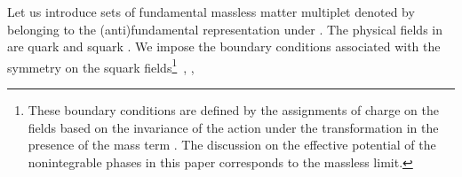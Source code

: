 \documentclass[a4paper,12pt]{article}
\begin{document}





\par
Let us introduce \coordHE{} sets of fundamental massless matter 
multiplet denoted by \coordHE{} belonging 
to the (anti)fundamental representation
under \coordHE{}. The physical fields in \coordHE{}
are quark \coordHE{} and squark \coordHE{}.
We impose the boundary conditions associated with 
the \coordHE{} symmetry on the squark 
fields\footnote{These boundary 
conditions are defined by the assignments of \coordHE{} charge
on the fields based on the invariance of the action under the
\coordHE{} transformation in the presence of
the mass term \coordHE{}. 
The discussion on the effective potential of the 
nonintegrable phases in this paper corresponds to the 
massless limit.}~\cite{takenaga}, \coordHE{},
\end{document}
